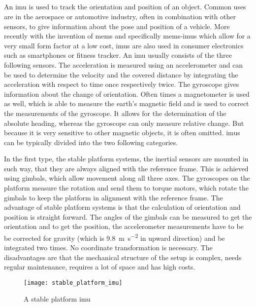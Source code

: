 \subsection{}
An \gls{imu} is used to track the orientation and position of an object.
Common uses are in the aerospace or automotive industry, often in combination with other sensors, to give information about the pose and position of a vehicle.
More recently with the invention of \gls{mems} and specifically \gls{mems}-\gls{imu}s which allow for a very small form factor at a low cost, \gls{imu}s are also used in consumer electronics such as smartphones or fitness tracker.
An \gls{imu} usually consists of the three following sensors.
The acceleration is measured using an accelerometer and can be used to determine the velocity and the covered distance by integrating the acceleration with respect to time once respectively twice.
The gyroscope gives information about the change of orientation.
Often times a magnetometer is used as well, which is able to measure the earth's magnetic field and is used to correct the measurements of the gyroscope.
It allows for the determination of the absolute heading, whereas the gyroscope can only measure relative change. But because it is very sensitive to other magnetic objects, it is often omitted.
\gls{imu}s can be typically divided into the two following categories.

In the first type, the stable platform systems, the inertial sensors are mounted in such way, that they are always aligned with the reference frame.
This is achieved using gimbals, which allow movement along all three axes.
The gyroscopes on the platform measure the rotation and send them to torque motors, which rotate the gimbals to keep the platform in alignment with the reference frame.
The advantage of stable platform systems is that the calculation of orientation and position is straight forward.
The angles of the gimbals can be measured to get the orientation and to get the position, the accelerometer measurements have to be be corrected for gravity (which is \SI{9.8}{\metre\per\second^2} in upward direction) and be integrated two times.
No coordinate transformation is necessary.
The disadvantages are that the mechanical structure of the setup is complex, needs regular maintenance, requires a lot of space and has high costs.
\begin{figure}[htbp]
\centering
\texttt{[image: stable\_platform\_imu]}
\caption{A stable platform \acrshort{imu} \cite{Woodman07anintroduction}}
\label{fig:stable_platform_imu}
\end{figure}

